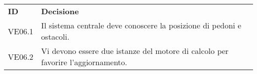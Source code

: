 \documentclass[]{article}
\begin{document}
	\begin{table} [h!]
		\begin{center}
			\begin{tabular} { m{2cm} m{14cm} }
				\rowcolor{lightgray}
				\textbf{ID} & \textbf{Decisione}\\
				VE06.1 & Il sistema centrale deve conoscere la posizione di pedoni e ostacoli.\\
				VE06.2 & Vi devono essere due istanze del motore di calcolo per favorire l'aggiornamento.\\

			\end{tabular}
		\end{center}
	\end{table}
\end{document}
